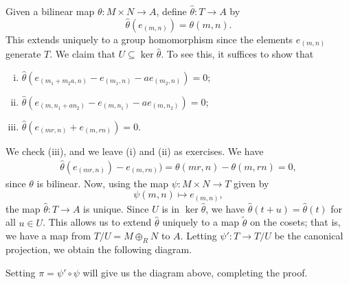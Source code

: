 \begin{pf}
    Given a bilinear map $\theta : M \times N \to A$, define 
    $\hat\theta : T \to A$ by 
    \[ \hat\theta(e_{(m,n)}) = \theta(m, n). \] 
    This extends uniquely to a group homomorphism since the elements 
    $e_{(m,n)}$ generate $T$. We claim that $U \subseteq 
    \ker\hat\theta$. To see this, it suffices to show that 
    \begin{enumerate}[(i)]
        \item $\hat\theta(e_{(m_1+m_2a, n)} - e_{(m_1, n)} 
        - ae_{(m_2, n)}) = 0$; 
        \item $\hat\theta(e_{(m,n_1+an_2)} - e_{(m,n_1)} - 
        ae_{(m,n_2)}) = 0$; 
        \item $\hat\theta(e_{(mr, n)} + e_{(m, rn)}) = 0$. 
    \end{enumerate}
    We check (iii), and we leave (i) and (ii) as exercises. We have 
    \begin{align*}
        \hat\theta(e_{(mr, n)}) - e_{(m, rn)}) = 
        \theta(mr, n) - \theta(m, rn) = 0, 
    \end{align*}
    since $\theta$ is bilinear. Now, using the map $\psi : M \times N \to T$ 
    given by 
    \[ \psi(m, n) \mapsto e_{(m, n)}, \] 
    the map $\hat\theta : T \to A$ is unique. Since $U$ is in $\ker\hat\theta$, 
    we have $\hat\theta(t + u) = \hat\theta(t)$ for all $u \in U$. This allows 
    us to extend $\hat\theta$ uniquely to a map $\tilde\theta$ on the cosets; 
    that is, we have a map from $T/U = M \oplus_R N$ to $A$. Letting 
    $\psi' : T \to T/U$ be the canonical projection, we obtain the following 
    diagram. 
    \begin{center}
    \end{center}
    Setting $\pi = \psi' \circ \psi$ will give us the diagram above, 
    completing the proof. 
\end{pf}

